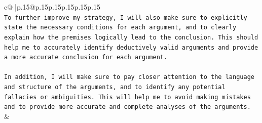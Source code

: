 \documentclass{article}
\begin{document}
{\begin{supertabular}{c@{$\;$}|p{.15\linewidth}@{}p{.15\linewidth}p{.15\linewidth}p{.15\linewidth}p{.15\linewidth}p{.15\linewidth}}
{{{\\ 
\texttt{To further improve my strategy, I will also make sure to explicitly state the necessary conditions for each argument, and to clearly explain how the premises logically lead to the conclusion. This should help me to accurately identify deductively valid arguments and provide a more accurate conclusion for each argument.} \\
\\ 
\texttt{In addition, I will make sure to pay closer attention to the language and structure of the arguments, and to identify any potential fallacies or ambiguities. This will help me to avoid making mistakes and to provide more accurate and complete analyses of the arguments.} \\
            }
        }
    }
    & \\ \\

\end{supertabular}
}
\end{document}
